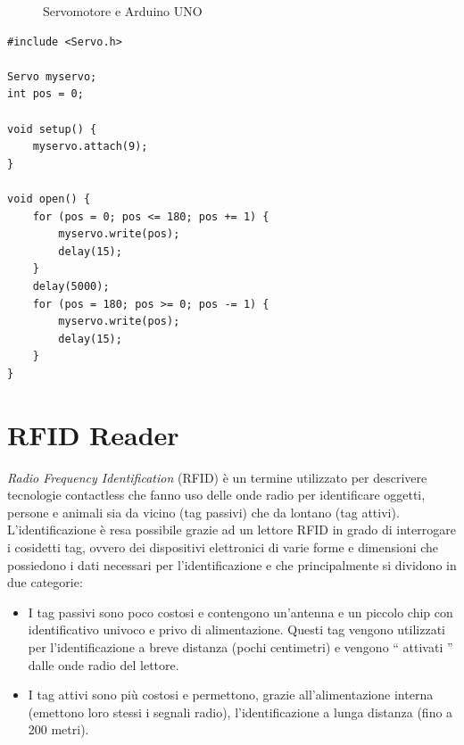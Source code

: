 \documentclass[12pt]{report}
\begin{document}
\begin{figure}[H]
	\caption{Servomotore e Arduino UNO}
	\label{fig:servo_uno}
\end{figure}

\pagebreak

\begin{lstlisting}[caption={Esempio di codice per controllare il servomotore: innanzittutto il servo viene collegato al pin 9 dell'Arduino e viene fatto ruotare di 180 gradi da una parte (aprendo la porta); dopo 5 secondi viene fatto ruotare di 180 gradi dalla parte opposta}, label={lst:servo}]
#include <Servo.h>

Servo myservo;
int pos = 0;

void setup() {
	myservo.attach(9);
}

void open() {
	for (pos = 0; pos <= 180; pos += 1) {  
		myservo.write(pos);				 
		delay(15);                      
	}
	delay(5000);
	for (pos = 180; pos >= 0; pos -= 1) {  
		myservo.write(pos);				   
		delay(15);                        
	}
}
\end{lstlisting}

%
\section{RFID Reader}
%

\emph{Radio Frequency Identification} (RFID) è un termine utilizzato per descrivere tecnologie contactless che fanno uso delle onde radio per identificare oggetti, persone e animali sia da vicino (tag passivi) che da lontano (tag attivi). L'identificazione è resa possibile grazie ad un lettore RFID in grado di interrogare i cosidetti tag, ovvero dei dispositivi elettronici di varie forme e dimensioni che possiedono i dati necessari per l'identificazione e che principalmente si dividono in due categorie: 

\begin{itemize}
	\item I tag passivi sono poco costosi e contengono un'antenna e un piccolo chip con identificativo univoco e privo di alimentazione. Questi tag vengono utilizzati per l'identificazione a breve distanza (pochi centimetri) e vengono \textquotedblleft{} attivati \textquotedblright{} dalle onde radio del lettore.
	\item I tag attivi sono più costosi e permettono, grazie all'alimentazione interna (emettono loro stessi i segnali radio), l'identificazione a lunga distanza (fino a 200 metri).
\end{itemize}
\end{document}
